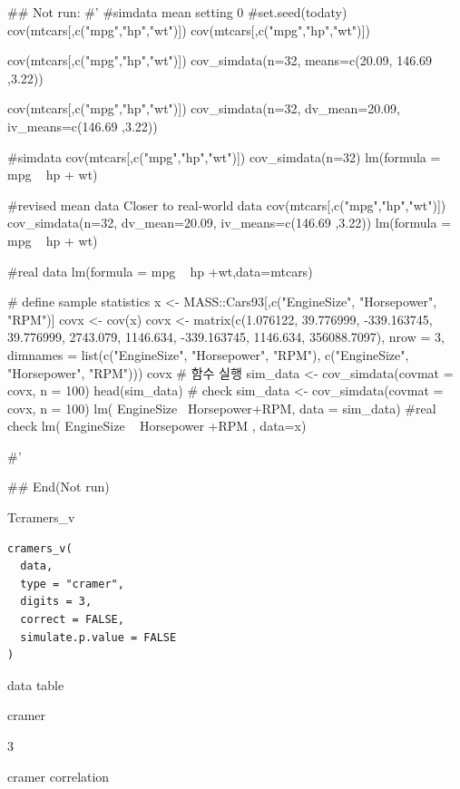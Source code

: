 \documentclass[a4paper]{book}
\begin{document}
%
\begin{Examples}
\begin{ExampleCode}

\#\# Not run: 
#'
#simdata mean setting 0
#set.seed(todaty)
cov(mtcars[,c("mpg","hp","wt")]) %
cov(mtcars[,c("mpg","hp","wt")]) %

cov(mtcars[,c("mpg","hp","wt")]) %
  cov_simdata(n=32, means=c(20.09, 146.69 ,3.22))

cov(mtcars[,c("mpg","hp","wt")]) %
  cov_simdata(n=32, dv_mean=20.09, iv_means=c(146.69 ,3.22))

#simdata
cov(mtcars[,c("mpg","hp","wt")]) %
  cov_simdata(n=32) %
  lm(formula = mpg ~ hp + wt)%

#revised mean data Closer to real-world data
cov(mtcars[,c("mpg","hp","wt")]) %
  cov_simdata(n=32, dv_mean=20.09, iv_means=c(146.69 ,3.22)) %
  lm(formula = mpg ~ hp + wt)%


#real data
lm(formula = mpg ~ hp +wt,data=mtcars)%



# define sample statistics
x <- MASS::Cars93[,c("EngineSize", "Horsepower", "RPM")]
covx <- cov(x)
covx <- matrix(c(1.076122, 39.776999, -339.163745,
                 39.776999, 2743.079, 1146.634,
                 -339.163745, 1146.634, 356088.7097), nrow = 3,
               dimnames = list(c("EngineSize", "Horsepower", "RPM"),
                               c("EngineSize", "Horsepower", "RPM")))
covx
# 함수 실행
sim_data <- cov_simdata(covmat = covx, n = 100)
head(sim_data)
# check
sim_data <- cov_simdata(covmat = covx, n = 100)
lm( EngineSize~ Horsepower+RPM, data = sim_data) %
#real check
lm( EngineSize ~ Horsepower +RPM , data=x)%



#'

## End(Not run)
\end{ExampleCode}
\end{Examples}

%
\begin{Description}
Tcramers\_v
\end{Description}
%
\begin{Usage}
\begin{verbatim}
cramers_v(
  data,
  type = "cramer",
  digits = 3,
  correct = FALSE,
  simulate.p.value = FALSE
)
\end{verbatim}
\end{Usage}
%
\begin{Arguments}
\begin{ldescription}
\item[\code{data}] data table

\item[\code{type}] cramer

\item[\code{digits}] 3
\end{ldescription}
\end{Arguments}
%
\begin{Value}
cramer correlation
\end{Value}
\end{document}
